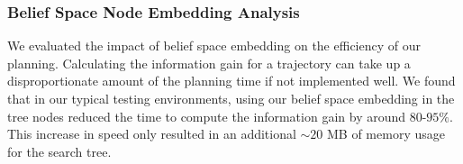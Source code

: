





\subsubsection{Belief Space Node Embedding Analysis}



We evaluated the impact of belief space embedding on the efficiency of our planning. Calculating the information gain for a trajectory can take up a disproportionate amount of the planning time if not implemented well. We found that in our typical testing environments, using our belief space embedding in the tree nodes reduced the time to compute the information gain by around $80$-$95\%$. This increase in speed only resulted in an additional ${\sim}20$ MB of memory usage for the search tree. 

